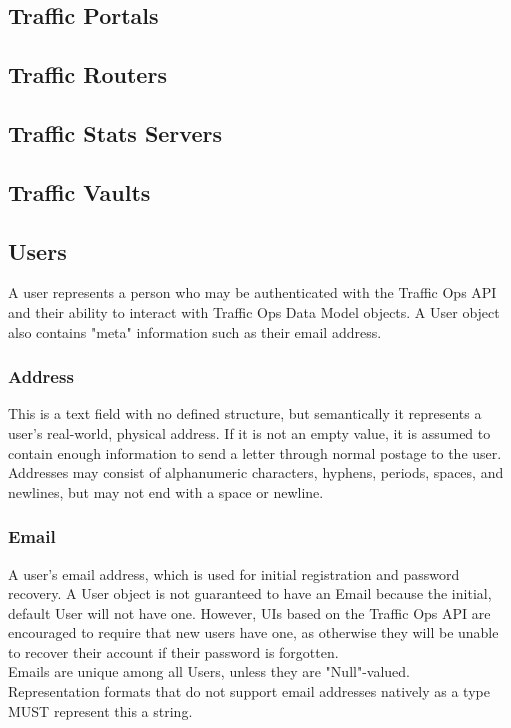 \subsection{Traffic Portals}



\subsection{Traffic Routers}



\subsection{Traffic Stats Servers}



\subsection{Traffic Vaults}



\subsection{Users\label{sec:users}}
A user represents a person who may be authenticated with the Traffic Ops API and
their ability to interact with Traffic Ops Data Model objects. A User object also
contains "meta" information such as their email address.

\subsubsection{Address}
This is a text field with no defined structure, but semantically it represents a
user's real-world, physical address. If it is not an empty value, it is assumed
to contain enough information to send a letter through normal postage to the
user.\\
Addresses may consist of alphanumeric characters, hyphens, periods, spaces, and
newlines, but may not end with a space or newline.

\subsubsection{Email}
A user's email address, which is used for initial registration and password
recovery. A User object is not guaranteed to have an Email because the initial,
default User will not have one. However, UIs based on the Traffic Ops API are
encouraged to require that new users have one, as otherwise they will be unable
to recover their account if their password is forgotten.\\
Emails are unique among all Users, unless they are "Null"-valued.\\
Representation formats that do not support email addresses natively as a type
MUST represent this a string.

